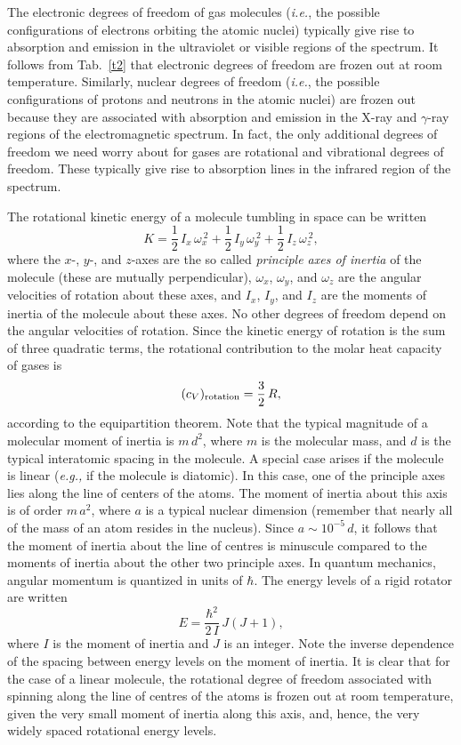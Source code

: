 The electronic degrees of freedom of gas molecules ({\em i.e.}, the possible
configurations of  electrons orbiting the atomic nuclei) typically give rise
to absorption and emission in the
ultraviolet or visible regions of the spectrum. It follows from Tab.~\ref{t2} that
electronic degrees of freedom are frozen out at room temperature. Similarly,
nuclear degrees of freedom ({\em i.e.}, the possible configurations of protons
and neutrons in the atomic nuclei) are frozen out because they are associated
with absorption and emission in the X-ray and $\gamma$-ray regions of the
electromagnetic spectrum. In fact, the only additional degrees of freedom
we need worry about for gases are rotational and vibrational degrees of freedom.
These typically give rise to absorption lines in the infrared region of the
spectrum. 

The rotational kinetic energy of a molecule tumbling in space can be written
\begin{equation}
K = \frac{1}{2}\, I_x \,\omega_x^{~2}+\frac{1}{2}\, I_y \,\omega_y^{~2}+
\frac{1}{2} \,I_z \,\omega_z^{~2},
\end{equation}
where the $x$-, $y$-, and $z$-axes are the so called {\em principle axes of inertia}
of the molecule (these are mutually perpendicular), $\omega_x$, $\omega_y$,
and $\omega_z$ are the angular velocities of rotation about these axes, and
$I_x$, $I_y$, and $I_z$ are the moments of inertia of the molecule about these
axes. No other degrees of freedom depend on the angular velocities of
rotation. Since the kinetic energy of rotation is the sum of three quadratic
terms, the rotational contribution to the molar heat capacity of gases
is
\begin{equation}
(c_V)_{\rm rotation} = \frac{3}{2}\, R,
\end{equation}
according to the equipartition theorem. Note that the typical magnitude of a
molecular moment of inertia is $m \,d^2$, where $m$ is the molecular mass, and
$d$ is  the typical interatomic spacing in the molecule. 
A special case arises if the molecule is linear
({\em e.g.,} if the molecule is diatomic). In this case, one of the principle axes lies
along the line of centers of the atoms. The moment of inertia about this axis
is of order $m\, a^2$, where $a$ is a typical nuclear dimension
(remember that nearly all of the mass of an atom resides in the nucleus). Since
$a \sim 10^{-5}\, d$, it follows that the moment of inertia about the line of
centres is minuscule compared to the moments of inertia about the other two
principle axes. In quantum mechanics, angular momentum is quantized in units
of $\hbar$. The  energy levels of a rigid rotator are written
\begin{equation}
E = \frac{\hbar^2}{2 \,I}\, J(J+1),
\end{equation}
where $I$ is the moment of inertia and $J$ is
an integer. Note the inverse dependence of the spacing between energy levels
on the moment
of inertia. It is clear that for the case of a linear molecule, the rotational
degree of freedom associated with spinning along the line of centres of the
atoms is frozen out at room
temperature, given the very small moment of inertia along this axis, and, hence,
the very widely spaced rotational energy levels. 

